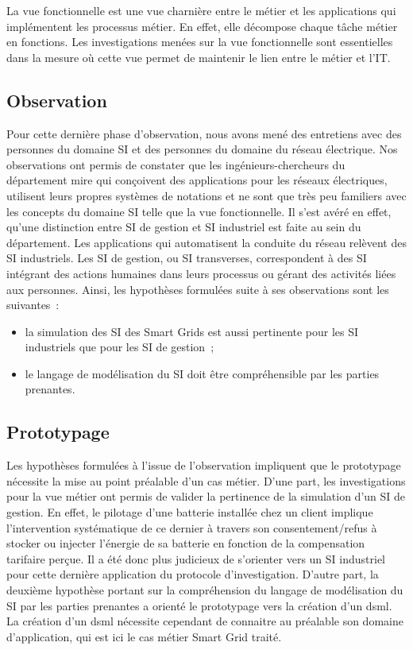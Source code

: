 La vue fonctionnelle est une vue charnière entre le métier et les applications qui  implémentent les processus métier. En effet, elle décompose chaque tâche métier en fonctions. Les investigations menées sur la vue fonctionnelle sont essentielles dans la mesure où cette vue permet de maintenir le lien entre le métier et l'IT. 

\subsection{Observation}
Pour cette dernière phase d'observation, nous avons mené des entretiens avec des personnes du domaine SI et des personnes du domaine du réseau électrique. Nos observations ont permis de constater que les ingénieurs-chercheurs du département \gls{mire} qui conçoivent des applications pour les réseaux électriques, utilisent leurs propres systèmes de notations et ne sont que très peu familiers avec les concepts du domaine SI telle que la vue fonctionnelle. Il s'est avéré en effet, qu'une distinction entre SI de gestion et SI industriel est faite au sein du département. Les applications qui automatisent la conduite du réseau relèvent des SI industriels. Les SI de gestion, ou SI transverses, correspondent à des SI intégrant des actions humaines dans leurs processus ou gérant des activités liées aux personnes.
Ainsi, les hypothèses formulées suite à ses observations sont les suivantes~:
\begin{itemize}
    \item la simulation des SI des Smart Grids est aussi pertinente pour les SI industriels que pour les SI de gestion~;
	\item le langage de modélisation du SI doit être compréhensible par les parties prenantes.
\end{itemize}	 

\subsection{Prototypage}
Les hypothèses formulées à l'issue de l'observation impliquent que le prototypage nécessite la mise au point préalable d'un cas métier. D'une part, les investigations pour la vue métier ont permis de valider la pertinence de la simulation d'un SI de gestion. En effet, le pilotage d'une batterie installée chez un client implique l'intervention systématique de ce dernier à travers son consentement/refus à stocker ou injecter l'énergie de sa batterie en fonction de la compensation tarifaire perçue. Il a été donc plus judicieux de s'orienter vers un SI industriel pour cette dernière application du protocole  d'investigation. D'autre part, la deuxième hypothèse portant sur la compréhension du langage de modélisation du SI par les parties prenantes a orienté le prototypage vers la création d'un \gls{dsml}. La création d'un \gls{dsml} nécessite cependant de connaitre au préalable son domaine d'application, qui est ici le cas métier Smart Grid traité. 

